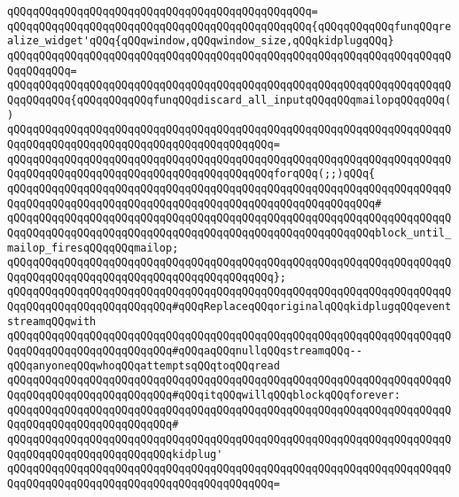 \verb|qQQqqQQqqQQqqQQqqQQqqQQqqQQqqQQqqQQqqQQqqQQqqQQq=|\newline
\verb|qQQqqQQqqQQqqQQqqQQqqQQqqQQqqQQqqQQqqQQqqQQqqQQq{qQQqqQQqqQQqfunqQQqrealize_widget'qQQq{qQQqwindow,qQQqwindow_size,qQQqkidplugqQQq}|\newline
\verb|qQQqqQQqqQQqqQQqqQQqqQQqqQQqqQQqqQQqqQQqqQQqqQQqqQQqqQQqqQQqqQQqqQQqqQQqqQQqqQQq=|\newline
\verb|qQQqqQQqqQQqqQQqqQQqqQQqqQQqqQQqqQQqqQQqqQQqqQQqqQQqqQQqqQQqqQQqqQQqqQQqqQQqqQQq{qQQqqQQqqQQqfunqQQqdiscard_all_inputqQQqqQQqmailopqQQqqQQq()|\newline
\verb|qQQqqQQqqQQqqQQqqQQqqQQqqQQqqQQqqQQqqQQqqQQqqQQqqQQqqQQqqQQqqQQqqQQqqQQqqQQqqQQqqQQqqQQqqQQqqQQqqQQqqQQqqQQqqQQq=|\newline
\verb|qQQqqQQqqQQqqQQqqQQqqQQqqQQqqQQqqQQqqQQqqQQqqQQqqQQqqQQqqQQqqQQqqQQqqQQqqQQqqQQqqQQqqQQqqQQqqQQqqQQqqQQqqQQqqQQqforqQQq(;;)qQQq{|\newline
\verb|qQQqqQQqqQQqqQQqqQQqqQQqqQQqqQQqqQQqqQQqqQQqqQQqqQQqqQQqqQQqqQQqqQQqqQQqqQQqqQQqqQQqqQQqqQQqqQQqqQQqqQQqqQQqqQQqqQQqqQQqqQQqqQQq#|\newline
\verb|qQQqqQQqqQQqqQQqqQQqqQQqqQQqqQQqqQQqqQQqqQQqqQQqqQQqqQQqqQQqqQQqqQQqqQQqqQQqqQQqqQQqqQQqqQQqqQQqqQQqqQQqqQQqqQQqqQQqqQQqqQQqqQQqblock_until_mailop_firesqQQqqQQqmailop;|\newline
\verb|qQQqqQQqqQQqqQQqqQQqqQQqqQQqqQQqqQQqqQQqqQQqqQQqqQQqqQQqqQQqqQQqqQQqqQQqqQQqqQQqqQQqqQQqqQQqqQQqqQQqqQQqqQQqqQQq};|\newline
\newline
\verb|qQQqqQQqqQQqqQQqqQQqqQQqqQQqqQQqqQQqqQQqqQQqqQQqqQQqqQQqqQQqqQQqqQQqqQQqqQQqqQQqqQQqqQQqqQQqqQQq#qQQqReplaceqQQqoriginalqQQqkidplugqQQqeventstreamqQQqwith|\newline
\verb|qQQqqQQqqQQqqQQqqQQqqQQqqQQqqQQqqQQqqQQqqQQqqQQqqQQqqQQqqQQqqQQqqQQqqQQqqQQqqQQqqQQqqQQqqQQqqQQq#qQQqaqQQqnullqQQqstreamqQQq--qQQqanyoneqQQqwhoqQQqattemptsqQQqtoqQQqread|\newline
\verb|qQQqqQQqqQQqqQQqqQQqqQQqqQQqqQQqqQQqqQQqqQQqqQQqqQQqqQQqqQQqqQQqqQQqqQQqqQQqqQQqqQQqqQQqqQQqqQQq#qQQqitqQQqwillqQQqblockqQQqforever:|\newline
\verb|qQQqqQQqqQQqqQQqqQQqqQQqqQQqqQQqqQQqqQQqqQQqqQQqqQQqqQQqqQQqqQQqqQQqqQQqqQQqqQQqqQQqqQQqqQQqqQQq#|\newline
\verb|qQQqqQQqqQQqqQQqqQQqqQQqqQQqqQQqqQQqqQQqqQQqqQQqqQQqqQQqqQQqqQQqqQQqqQQqqQQqqQQqqQQqqQQqqQQqqQQqkidplug'|\newline
\verb|qQQqqQQqqQQqqQQqqQQqqQQqqQQqqQQqqQQqqQQqqQQqqQQqqQQqqQQqqQQqqQQqqQQqqQQqqQQqqQQqqQQqqQQqqQQqqQQqqQQqqQQqqQQqqQQq=|\newline
